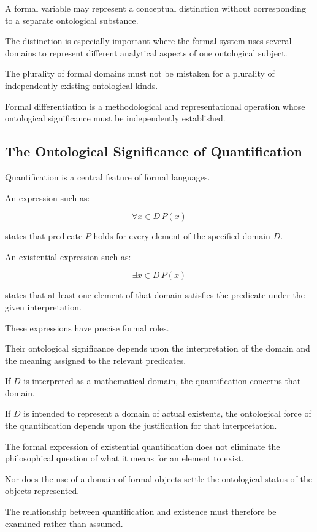 A formal variable may
represent a conceptual
distinction without
corresponding to a
separate ontological
substance.

The distinction is especially
important where the formal
system uses several domains
to represent different
analytical aspects of
one ontological subject.

The plurality of formal
domains must not be
mistaken for a plurality
of independently existing
ontological kinds.

Formal differentiation
is a methodological
and representational
operation whose ontological
significance must be
independently established.

\subsection{The Ontological Significance of Quantification}

Quantification is a central
feature of formal languages.

An expression such as:

\[
    \forall x\in D\, P(x)
\]

states that predicate \(P\)
holds for every element
of the specified domain \(D\).

An existential expression
such as:

\[
    \exists x\in D\, P(x)
\]

states that at least one
element of that domain
satisfies the predicate
under the given interpretation.

These expressions have
precise formal roles.

Their ontological significance
depends upon the interpretation
of the domain and the
meaning assigned to
the relevant predicates.

If \(D\) is interpreted
as a mathematical domain,
the quantification concerns
that domain.

If \(D\) is intended
to represent a domain
of actual existents,
the ontological force
of the quantification
depends upon the
justification for that
interpretation.

The formal expression
of existential quantification
does not eliminate
the philosophical question
of what it means
for an element to exist.

Nor does the use
of a domain of formal
objects settle the
ontological status
of the objects represented.

The relationship between
quantification and existence
must therefore be examined
rather than assumed.

